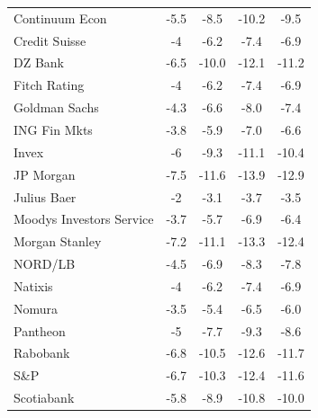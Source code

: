 \begin{table}[H]
{\begin{tabular}{l|c|ccc}
Continuum Econ                   & -5.5            & -8.5            & -10.2          & -9.5           \\
Credit Suisse                    & -4              & -6.2            & -7.4           & -6.9           \\
DZ Bank                          & -6.5            & -10.0           & -12.1          & -11.2          \\
Fitch Rating                     & -4              & -6.2            & -7.4           & -6.9           \\
Goldman Sachs                    & -4.3            & -6.6            & -8.0           & -7.4           \\
ING Fin Mkts                     & -3.8            & -5.9            & -7.0           & -6.6           \\
Invex                            & -6              & -9.3            & -11.1          & -10.4          \\
JP Morgan                        & -7.5            & -11.6           & -13.9          & -12.9          \\
Julius Baer                      & -2              & -3.1            & -3.7           & -3.5           \\
Moodys Investors Service         & -3.7            & -5.7            & -6.9           & -6.4           \\
Morgan Stanley                   & -7.2            & -11.1           & -13.3          & -12.4          \\
NORD/LB                          & -4.5            & -6.9            & -8.3           & -7.8           \\
Natixis                          & -4              & -6.2            & -7.4           & -6.9           \\
Nomura                           & -3.5            & -5.4            & -6.5           & -6.0           \\
Pantheon                         & -5              & -7.7            & -9.3           & -8.6           \\
Rabobank                         & -6.8            & -10.5           & -12.6          & -11.7          \\
S\&P                             & -6.7            & -10.3           & -12.4          & -11.6          \\
Scotiabank                       & -5.8            & -8.9            & -10.8          & -10.0          \\

\end{tabular}}
\end{table}
